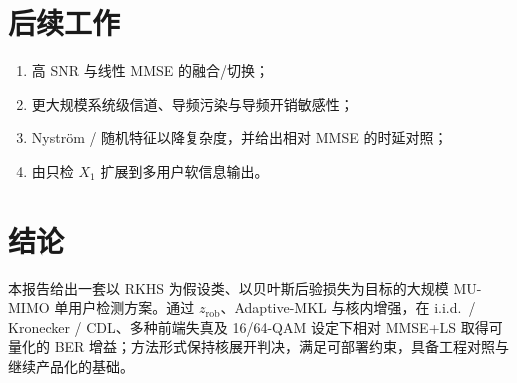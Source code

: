 \section{后续工作}

\begin{enumerate}[leftmargin=2em]
  \item 高 SNR 与线性 MMSE 的融合/切换；
  \item 更大规模系统级信道、导频污染与导频开销敏感性；
  \item Nyström / 随机特征以降复杂度，并给出相对 MMSE 的时延对照；
  \item 由只检 $X_1$ 扩展到多用户软信息输出。
\end{enumerate}

\section{结论}

本报告给出一套以 RKHS 为假设类、以贝叶斯后验损失为目标的大规模 MU-MIMO 单用户检测方案。通过 $z_{\mathrm{rob}}$、Adaptive-MKL 与核内增强，在 i.i.d.\ / Kronecker / CDL、多种前端失真及 16/64-QAM 设定下相对 MMSE+LS 取得可量化的 BER 增益；方法形式保持核展开判决，满足可部署约束，具备工程对照与继续产品化的基础。
